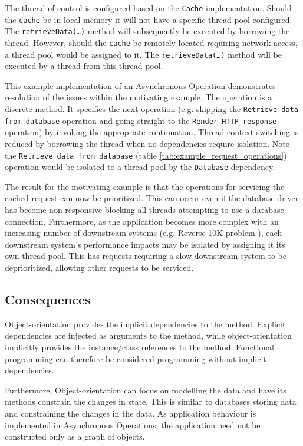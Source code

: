 \documentclass[prodmode]{style/acmlarge}
\begin{document}
The thread of control is configured based on the \texttt{Cache} implementation.
 Should the \texttt{cache} be in local memory it will not have a specific thread
pool configured.  The \texttt{retrieveData(\ldots)} method will subsequently be
executed by borrowing the thread.  However, should the \texttt{cache} be
remotely located requiring network access, a thread pool would be assigned to
it.  The \texttt{retrieveData(\ldots)} method will be executed by a thread from
this thread pool.

This example implementation of an Asynchronous Operation demonstrates resolution
of the issues within the motivating example.  The operation is a discrete
method.  It specifies the next operation (e.g. skipping the \texttt{Retrieve
data from database} operation and going straight to the \texttt{Render HTTP
response} operation) by invoking the appropriate continuation.  Thread-context
switching is reduced by borrowing the thread when no dependencies require
isolation.  Note the \texttt{Retrieve data from database} (table
\ref{tab:example_request_operations}) operation would be isolated to a thread
pool by the \texttt{Database} dependency.


The result for the motivating example is that the operations for servicing the
cached request can now be prioritized.  This can occur even if the database
driver has become non-responsive blocking all threads attempting to use a
database connection.  Furthermore, as the application becomes more complex with
an increasing number of downstream systems (e.g. Reverse 10K problem
\cite{reverse-ten-k-problem}), each downstream system's performance impacts may
be isolated by assigning it its own thread pool.  This has requests requiring a
slow downstream system to be deprioritized, allowing other requests to be
serviced.


\subsection{Consequences}

Object-orientation provides the implicit dependencies to the method.  Explicit
dependencies are injected as arguments to the method, while object-orientation
implicitly provides the instance/class references to the method.  Functional
programming can therefore be considered programming without implicit
dependencies.

Furthermore, Object-orientation can focus on modelling the data and have its
methods constrain the changes in state.  This is similar to databases storing
data and constraining the changes in the data.  As application behaviour is
implemented in Asynchronous Operations, the application need not be constructed
only as a graph of objects.
\end{document}
